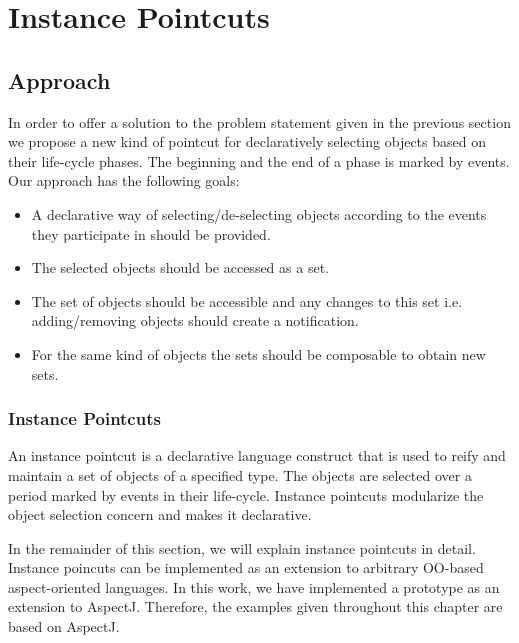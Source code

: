 


\chapter{Instance Pointcuts}




\section{Approach}
\label{sect:approach}
In order to offer a solution to the problem statement given in the previous section we propose a new kind of pointcut for declaratively selecting objects based on their life-cycle phases. The beginning and the end of a phase is marked by events. Our approach has the following goals:

\begin{itemize}
\item A declarative way of selecting/de-selecting objects according to the events they participate in should be provided.
\item The selected objects should be accessed as a set.
\item The set of objects should be accessible and any changes to this set i.e. adding/removing objects should create a notification.
\item For the same kind of objects the sets should be composable to obtain new sets.
\end{itemize}

\subsection{Instance Pointcuts}
\label{sect:ip}
An instance pointcut is a declarative language construct that is used to reify and maintain a set of objects of a specified type. The objects are selected over a period marked by events in their life-cycle. Instance pointcuts modularize the object selection concern and makes it declarative. 
 
In the remainder of this section, we will explain instance pointcuts in detail. Instance poincuts can be implemented as an extension to arbitrary OO-based aspect-oriented languages. In this work, we have implemented a prototype as an extension to AspectJ. Therefore, the examples given throughout this chapter are based on AspectJ.

